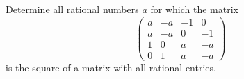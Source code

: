 \documentclass{article}
\begin{document}
\setlength{\parindent}{0pt}
Determine all rational numbers \(\displaystyle a\) for which the matrix
$$\begin{pmatrix}
	a & -a & -1 & 0 \\
	a & -a & 0 & -1 \\
	1 & 0 & a & -a \\
	0 & 1 & a & -a
\end{pmatrix}
$$
is the square of a matrix with all rational entries.
\end{document}
